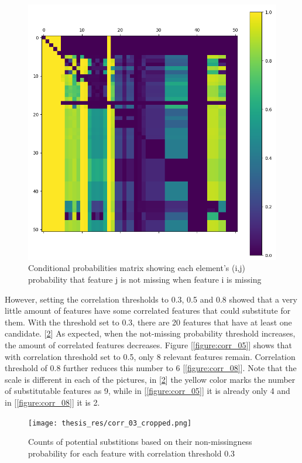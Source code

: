 \documentclass[11pt]{article}
\begin{document}
        \begin{figure}
          \centering
          \includegraphics[scale=0.5]{thesis_res/cond/heatmap_cropped.png}
          \caption{Conditional probabilities matrix showing each element's (i,j) probability that feature j is not missing when feature i is missing}
          \label{figure:cond_prob_matrix}
        \end{figure}
        \newpage
        \noindent However, setting the correlation thresholds to 0.3, 0.5 and 0.8 showed that a very little amount of features have some correlated features that could substitute for them. With the threshold set to 0.3, there are 20 features that have at least one candidate. [\ref{figure:corr_03}] As expected, when the not-missing probability threshold increases, the amount of correlated features decreases. Figure [\ref{figure:corr_05}] shows that with correlation threshold set to 0.5, only 8 relevant features remain. Correlation threshold of 0.8 further reduces this number to 6 [\ref{figure:corr_08}]. Note that the scale is different in each of the pictures, in [\ref{figure:corr_03}] the yellow color marks the number of substitutable features as 9, while in [\ref{figure:corr_05}] it is already only 4 and in [\ref{figure:corr_08}] it is 2.
        \begin{figure}
          \centering
          \texttt{[image: thesis\_res/corr\_03\_cropped.png]}
          \caption{Counts of potential substitions based on their non-missingness probability for each feature with correlation threshold 0.3}
          \label{figure:corr_03}
        \end{figure}
\end{document}
